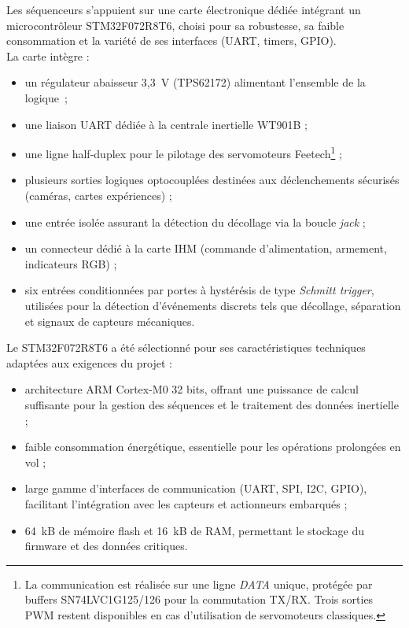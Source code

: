 Les séquenceurs s’appuient sur une carte électronique dédiée intégrant un microcontrôleur STM32F072R8T6, choisi pour sa
robustesse, sa faible consommation et la variété de ses interfaces (UART, timers, GPIO). \\

La carte intègre :
\begin{itemize}
    \item un régulateur abaisseur 3,3~V (TPS62172) alimentant l’ensemble de la logique~;
    \item une liaison UART dédiée à la centrale inertielle WT901B ;
    \item une ligne half-duplex pour le pilotage des servomoteurs Feetech\footnote{La communication est réalisée sur une ligne
    \textit{DATA} unique, protégée par buffers SN74LVC1G125/126 pour la commutation TX/RX. Trois sorties PWM restent
    disponibles en cas d’utilisation de servomoteurs classiques.} ;
    \item plusieurs sorties logiques optocouplées destinées aux déclenchements sécurisés (caméras, cartes expériences) ;
    \item une entrée isolée assurant la détection du décollage via la boucle \textit{jack} ;
    \item un connecteur dédié à la carte IHM (commande d’alimentation, armement, indicateurs RGB) ;
    \item six entrées conditionnées par portes à hystérésis de type \textit{Schmitt trigger}, utilisées pour la détection
    d’événements discrets tels que décollage, séparation et signaux de capteurs mécaniques.
\end{itemize}

Le STM32F072R8T6 a été sélectionné pour ses caractéristiques techniques adaptées aux exigences du projet :
\begin{itemize}
    \item architecture ARM Cortex-M0 32 bits, offrant une puissance de calcul suffisante pour la gestion des séquences et
    le traitement des données inertielle ;
    \item faible consommation énergétique, essentielle pour les opérations prolongées en vol ;
    \item large gamme d’interfaces de communication (UART, SPI, I2C, GPIO), facilitant l’intégration avec les capteurs et
    actionneurs embarqués ;
    \item 64~kB de mémoire flash et 16~kB de RAM, permettant le stockage du firmware et des données critiques. \\
\end{itemize}

